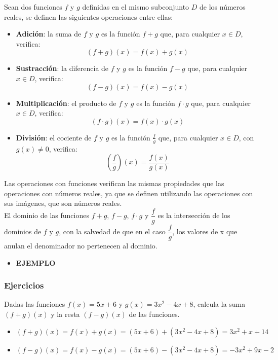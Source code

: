 
Sean dos funciones $f$ y $g$ definidas en el mismo subconjunto $D$ de los números reales, se definen las siguientes operaciones entre ellas:
\begin{itemize}
	\item \textbf{Adición}: la suma de $f$ y $g$ es la función $f+g$ que, para cualquier $x \in D$, verifica:
	$$(f+g)(x) = f(x)+g(x)$$
	\item \textbf{Sustracción}: la diferencia de $f$ y $g$ es la función $f-g$ que, para cualquier $x \in D$, verifica:
	$$(f-g)(x) = f(x)-g(x)$$
	\item \textbf{Multiplicación}: el producto de $f$ y $g$ es la función $f \cdot g$ que, para cualquier $x \in D$, verifica:
	$$(f \cdot g)(x) = f(x) \cdot g(x)$$
	\item \textbf{División}: el cociente de $f$ y $g$ es la función $\frac{f}{g}$ que, para cualquier $x \in D$, con $g(x) \neq 0$, verifica:
	$$(\dfrac{f}{g})(x) = \dfrac{f(x)}{g(x)}$$
\end{itemize}
Las operaciones con funciones verifican las mismas propiedades que las operaciones con números reales, ya que se definen utilizando las operaciones con sus imágenes, que son números reales.\\
El dominio de las funciones $f+g$, $f-g$, $f \cdot g$ y $\dfrac{f}{g}$ es la intersección de los dominios de $f$ y $g$, con la salvedad de que en el caso $\dfrac{f}{g}$, los valores de x que anulan el denominador no pertenecen al dominio.\\

\begin{itemize}
	\item \textbf{EJEMPLO}
                  \\
\end{itemize}


\subsubsection{Ejercicios}

\begin{ex}
	Dadas las funciones $f(x)=5x+6$ y $g(x)=3x^2-4x+8$, calcula la suma $(f+g)(x)$ y la resta $(f-g)(x)$ de las funciones.
	\begin{sol}
		\begin{itemize}
			\item $(f+g)(x) = f(x)+g(x) = (5x+6)+(3x^2-4x+8) = 3x^2+x+14$
			\item $(f-g)(x) = f(x)-g(x) = (5x+6)-(3x^2-4x+8) = -3x^2+9x-2$
		\end{itemize}
	\end{sol}
\end{ex}

